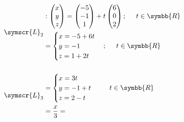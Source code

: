 \documentclass{article}
\def\fancyL{\symscr{L}}
\def\realR{\symbb{R}}
\begin{document}
\begin{enumerate}
\begin{enumerate}[label=\listAlph]
\[\begin{aligned}
                    &\fancyL_2
                    \begin{aligned}
                        &:\begin{pmatrix}
                            x \\ y \\ z
                        \end{pmatrix} 
                        = 
                        \begin{pmatrix}
                            -5 \\ -1 \\ 1
                        \end{pmatrix}
                        +
                        t\begin{pmatrix}
                            6 \\ 0 \\ 2
                        \end{pmatrix};
                        \hspace{0.5cm}
                        t \in \realR
                        \\
                        &= \begin{cases}
                            x = -5 + 6t\\
                            y = -1\\ 
                            z = 1 + 2t\\
                        \end{cases};
                        \hspace{0.5cm}
                        t \in \realR
                    \end{aligned}
                    \\[0.5cm]
                    &\fancyL_3
                    \begin{aligned}
                        &= \begin{cases}
                            x = 3t\\
                            y = -1 + t\\ 
                            z = 2 - t\\
                        \end{cases}
                        \hspace{0.5cm}
                        t \in \realR
                        \\
                        &=
                        \frac{x}{3}
                        =

\end{aligned}
\end{aligned}\]
\end{enumerate}
\end{enumerate}
\end{document}
